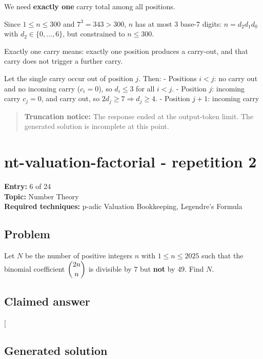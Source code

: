 \documentclass[
  11pt,
  letterpaper,
]{article}
\begin{document}
We need \textbf{exactly one} carry total among all positions.

Since \(1\le n\le 300\) and \(7^3=343>300\), \(n\) has at most 3 base-7
digits: \(n = d_2 d_1 d_0\) with \(d_2\in\{0,\dots,6\}\), but
constrained to \(n\le 300\).

Exactly one carry means: exactly one position produces a carry-out, and
that carry does not trigger a further carry.

Let the single carry occur out of position \(j\). Then: - Positions
\(i<j\): no carry out and no incoming carry (\(c_i=0\)), so
\(d_i \le 3\) for all \(i<j\). - Position \(j\): incoming carry
\(c_j=0\), and carry out, so \(2d_j\ge 7 \Rightarrow d_j\ge 4\). -
Position \(j+1\): incoming carry

\begin{quote}
\textbf{Truncation notice:} The response ended at the output-token
limit. The generated solution is incomplete at this point.
\end{quote}

\clearpage

\section{nt-valuation-factorial - repetition
2}\label{nt-valuation-factorial---repetition-2}

\textbf{Entry:} 6 of 24\\
\textbf{Topic:} Number Theory\\
\textbf{Required techniques:} p-adic Valuation Bookkeeping, Legendre's
Formula

\subsection{Problem}\label{problem-5}

Let \(N\) be the number of positive integers \(n\) with
\(1 \le n \le 2025\) such that the binomial coefficient
\(\dbinom{2n}{n}\) is divisible by \(7\) but \textbf{not} by \(49\).
Find \(N\).

\subsection{Claimed answer}\label{claimed-answer-5}

{[}\boxed{288}{]}

\subsection{Generated solution}\label{generated-solution-5}
\end{document}
